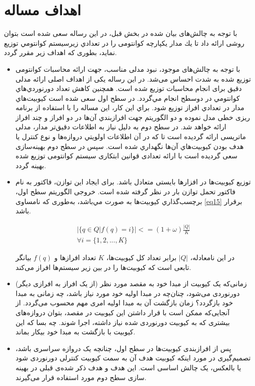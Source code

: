 \section{اهداف مساله}

با توجه به چالش‌های بیان شده در بخش قبل، در این رساله سعی شده است بتوان روشی ارائه داد تا يك مدار یکپارچه کوانتومی را در تعدادي زيرسيستم كوانتومي توزيع نمايد، بطوری که اهداف زیر مقرر گردد.
\begin{itemize}
\item
با توجه به چالش‌های موجود، نبود مدلی مناسب، جهت ارائه محاسبات کوانتومی توزیع شده به شدت احساس می‌شد. در این رساله یکی از اهداف اصلی ارائه مدلی دقیق برای انجام محاسبات توزیع شده است. همچنين كاهش تعداد دورنوردي‌هاي كوانتومي در دوسطح انجام مي‌گردد. در سطح اول سعی شده است كيوبيت‌هاي مدار در تعدادي افراز توزيع شود. براي اين كار، اين مساله را با استفاده از برنامه ریزی خطی مدل نموده و دو الگوريتم جهت افرازبندي آن‌ها در دو افراز و چند افراز ارائه خواهد شد. در سطح دوم به دلیل نیاز به اطلاعات دقیق‌تر مدار، مدلی ماتریسی ارائه گردیده است تا كه در آن اطلاعات اولويتي دروازه‌ها و نوع كنترل يا هدف بودن كيوبيت‌هاي آن‌ها نگهداري شده است. سپس در سطح دوم بهینه‌سازی سعی گردیده است با ارائه تعدادی قوانین ابتکاری سیستم کوانتومی توزیع شده بهینه‌ گردد.
\item
توزیع کیوبیت‌ها در افزارها بایستی متعادل باشد. برای ایجاد این توازن، فاکتور \lr{$\omega$} به نام فاکتور تحمل توازن بار در نظر گرفته شده است. خروجی الگوریتم سطح اول، برچسب‌گذاري کیوبیت‌ها به صورت مي‌باشد، به‌طوری که نامساوی \eqref{eq15} برقرار باشد.

\begin{equation}
\begin{split}
|\{q\in Q | f(q)=i\}|<=(1+\omega)\frac{|Q|}{K}  \\
\forall i=\{1,2,...,K\}
\end{split}
\label{eq15}
\end{equation}

در این نامعادله، $|Q|$ برابر تعداد کل کیوبیت‌ها، $K$ تعداد افرازها و $f(q)$ بیانگر تابعی است که کیوبیت‌ها را در بین زیر سیستم‌ها افراز می‌کند.
\item
زمانی‌که یک کیوبیت از مبدا خود به مقصد مورد نظر (از یک افراز به افرازی دیگر) دورنوردی می‌شود، چنان‌چه در مبدا اولیه خود مورد نیاز باشد، چه زمانی به مبدا خود بازگردد؟ زمان بازگشت آن به مبدا اولیه امری مهم محسوب می‌گردد. از آنجایی‌که ممکن است با قرار داشتن اين كيوبيت در مقصد، بتوان دروازه‌های بیشتری که به کیوبیت دورنوردی شده نیاز داشته، اجرا شوند. چه بسا که این کیوبیت با بازگشت به مبدا خود بیکار بماند. 
\item
پس از افرازبندی کیوبیت‌ها در سطح اول، چنانچه یک دروازه سراسری باشد، تصمیم‌گیری در مورد اینکه کیوبیت هدف آن به سمت کیوبیت کنترلی دورنوردی شود یا بالعکس، یک چالش اساسی است. این هدف و هدف ذکر شده‌ی قبلی در بهینه سازی سطح دوم مورد استفاده قرار می‌گیرند.

\end{itemize}

